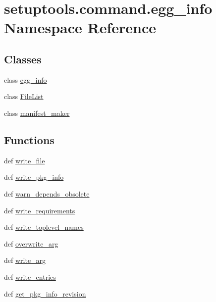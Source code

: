 \hypertarget{namespacesetuptools_1_1command_1_1egg__info}{}\section{setuptools.\+command.\+egg\+\_\+info Namespace Reference}
\label{namespacesetuptools_1_1command_1_1egg__info}
\subsection*{Classes}
\begin{DoxyCompactItemize}
\item 
class \hyperlink{classsetuptools_1_1command_1_1egg__info_1_1egg__info}{egg\+\_\+info}
\item 
class \hyperlink{classsetuptools_1_1command_1_1egg__info_1_1FileList}{File\+List}
\item 
class \hyperlink{classsetuptools_1_1command_1_1egg__info_1_1manifest__maker}{manifest\+\_\+maker}
\end{DoxyCompactItemize}
\subsection*{Functions}
\begin{DoxyCompactItemize}
\item 
def \hyperlink{namespacesetuptools_1_1command_1_1egg__info_a4d3a2f1372bdae9434245a68a7c760ab}{write\+\_\+file}
\item 
def \hyperlink{namespacesetuptools_1_1command_1_1egg__info_aadbc2b0597864ae835dbafb4c9e75885}{write\+\_\+pkg\+\_\+info}
\item 
def \hyperlink{namespacesetuptools_1_1command_1_1egg__info_ac3b3c08d172564b29c752c84a86d66fa}{warn\+\_\+depends\+\_\+obsolete}
\item 
def \hyperlink{namespacesetuptools_1_1command_1_1egg__info_af8155558b98bdd9e071c7abe978cf85c}{write\+\_\+requirements}
\item 
def \hyperlink{namespacesetuptools_1_1command_1_1egg__info_a546f5e619cdf7942738d3ef99b0084f7}{write\+\_\+toplevel\+\_\+names}
\item 
def \hyperlink{namespacesetuptools_1_1command_1_1egg__info_a86317e04f31058c7e67cae3161a35d50}{overwrite\+\_\+arg}
\item 
def \hyperlink{namespacesetuptools_1_1command_1_1egg__info_a902ae9aadf77fb1b0e2dea2cae9fd629}{write\+\_\+arg}
\item 
def \hyperlink{namespacesetuptools_1_1command_1_1egg__info_a3e692e501b39885f7489294241176746}{write\+\_\+entries}
\item 
def \hyperlink{namespacesetuptools_1_1command_1_1egg__info_a70b55b6ede6ef0ecc4513ffa6ba8dc32}{get\+\_\+pkg\+\_\+info\+\_\+revision}
\end{DoxyCompactItemize}


